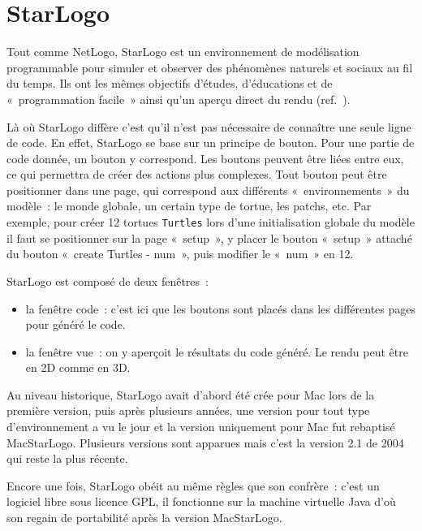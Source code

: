 \section{StarLogo}
\label{StarLogo}
Tout comme NetLogo, StarLogo est un environnement de modélisation programmable pour simuler et observer des phénomènes naturels et sociaux au fil du temps.
Ils ont les mêmes objectifs d'études, d'éducations et de «~programmation facile~» ainsi qu'un aperçu direct du rendu (ref.~\cite{starlogo}).

Là où StarLogo diffère c'est qu'il n'est pas nécessaire de connaître une seule ligne de code. En effet, StarLogo se base sur un principe de bouton. Pour une partie de code donnée, un bouton y correspond. Les boutons peuvent être liées entre eux, ce qui permettra de créer des actions plus complexes.
Tout bouton peut être positionner dans une page, qui correspond aux différents «~environnements~» du modèle~: le monde globale, un certain type de tortue, les patchs, etc.
Par exemple, pour créer 12 tortues \verb|Turtles|  lors d'une initialisation globale du modèle il faut se positionner sur la page «~setup~», y placer le bouton «~setup~» attaché du bouton «~create Turtles - num~», puis modifier le «~num~» en 12.

StarLogo est composé de deux fenêtres~:
\begin{itemize}
  \item la fenêtre code~: c'est ici que les boutons sont placés dans les différentes pages pour généré le code.
  \item la fenêtre vue~: on y aperçoit le résultats du code généré. Le rendu peut être en 2D comme en 3D.
\end{itemize}

Au niveau historique, StarLogo avait d'abord été crée pour Mac lors de la première version, puis après plusieurs années, une version pour tout type d'environnement a vu le jour et la version uniquement pour Mac fut rebaptisé MacStarLogo. Plusieurs versions sont apparues mais c'est la version 2.1 de 2004 qui reste la plus récente.

Encore une fois, StarLogo obéit au même règles que son confrère~: c'est un logiciel libre sous licence GPL, il fonctionne sur la machine virtuelle Java d'où son regain de portabilité après la version MacStarLogo.
